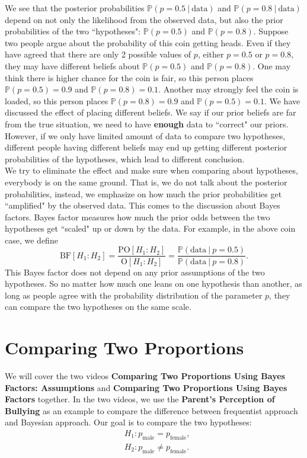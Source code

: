 \documentclass{article}
\begin{document}
We see that the posterior probabilities $\mathbb{P}(p = 0.5~|~\text{data})$ and $\mathbb{P}(p = 0.8~|~\text{data})$ depend on not only the likelihood from the observed data, but also the prior probabilities of the two ``hypotheses": $\mathbb{P}(p = 0.5)$ and $\mathbb{P}(p = 0.8)$. Suppose two people argue about the probability of this coin getting heads. Even if they have agreed that there are only 2 possible values of $p$, either $p=0.5$ or $p = 0.8$, they may have different beliefs about $\mathbb{P}(p = 0.5)$ and $\mathbb{P}(p = 0.8)$. One may think there is higher chance for the coin is fair, so this person places $\mathbb{P}(p=0.5)= 0.9$ and $\mathbb{P}(p = 0.8) = 0.1$. Another may strongly feel the coin is loaded, so this person places $\mathbb{P}(p=0.8) = 0.9$ and $\mathbb{P}(p=0.5) = 0.1$. We have discussed the effect of placing different beliefs. We say if our prior beliefs are far from the true situation, we need to have \textbf{enough} data to ``correct" our priors. However, if we only have limited amount of data to compare two hypotheses, different people having different beliefs may end up getting different posterior probabilities of the hypotheses, which lead to different conclusion. \\

We try to eliminate the effect and make sure when comparing about hypotheses, everybody is on the same ground. That is, we do not talk about the posterior probabilities, instead, we emphasize on how much the prior probabilities get ``amplified" by the observed data. This comes to the discussion about Bayes factors. Bayes factor measures how much the prior odds between the two hypotheses get ``scaled" up or down by the data. For example, in the above coin case, we define
$$ \text{BF}[H_1:H_2] = \frac{\text{PO}[H_1:H_2]}{\text{O}[H_1:H_2]} = \frac{\mathbb{P}(\text{data}~|~p = 0.5)}{\mathbb{P}(\text{data}~|~p = 0.8)}. $$
This Bayes factor does not depend on any prior assumptions of the two hypotheses. So no matter how much one leans on one hypothesis than another, as long as people agree with the probability distribution of the parameter $p$, they can compare the two hypotheses on the same scale. 


\section{Comparing Two Proportions}

We will cover the two videos \textbf{Comparing Two Proportions Using Bayes Factors: Assumptions} and \textbf{Comparing Two Proportions Using Bayes Factors} together. In the two videos, we use the \textbf{Parent's Perception of Bullying} as an example to compare the difference between frequentist approach and Bayesian approach. Our goal is to compare the two hypotheses:
\begin{align*}
& H_1: p_\text{male} = p_\text{female}, \\
& H_2: p_\text{male} \neq p_\text{female}.
\end{align*}
\end{document}
